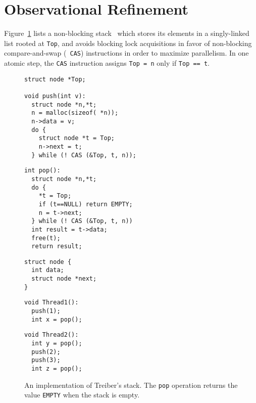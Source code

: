 \section{Observational Refinement}
\label{sec:refinement}


Figure~\ref{fig:treiber} lists a non-blocking stack~\cite{tr/Treiber86} which
stores its elements in a singly-linked list rooted at {\tt Top}, and avoids
blocking lock acquisitions in favor of non-blocking compare-and-swap ({\tt
CAS}) instructions in order to maximize parallelism. In one atomic step, the
{\tt CAS} instruction assigns {\tt Top = n} only if {\tt Top == t}.

\begin{figure}[t]
  \scriptsize
  \begin{minipage}[t]{41mm}
    \begin{verbatim}
struct node *Top;      
      
void push(int v):
  struct node *n,*t;
  n = malloc(sizeof( *n));
  n->data = v;
  do {
    struct node *t = Top;
    n->next = t;
  } while (! CAS (&Top, t, n));
    \end{verbatim}
  \end{minipage}
  \begin{minipage}[t]{40mm}
    \begin{verbatim}
int pop():
  struct node *n,*t;
  do {
    *t = Top;
    if (t==NULL) return EMPTY;
    n = t->next;
  } while (! CAS (&Top, t, n))
  int result = t->data;
  free(t);
  return result;
    \end{verbatim}
  \end{minipage}
  \begin{minipage}[t]{30mm}
    \begin{verbatim}
struct node {
  int data;
  struct node *next;
}
    \end{verbatim}
  \end{minipage}
  \begin{minipage}[t]{25mm}
    \begin{verbatim}
void Thread1():
  push(1);
  int x = pop();
    \end{verbatim}
  \end{minipage}
  \begin{minipage}[t]{25mm}
    \begin{verbatim}
void Thread2():
  int y = pop();
  push(2);
  push(3);
  int z = pop();
    \end{verbatim}
  \end{minipage}
  \caption{An implementation of Treiber's stack. The {\tt pop} operation
  returns the value {\tt EMPTY} when the stack is empty.}
  \label{fig:treiber}
\end{figure}

